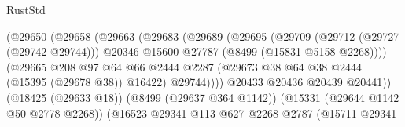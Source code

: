 \begin{lexlean}{RustStd}
\begin{coremodule}
                                            (@29650
                                              (@29658
                                                (@29663
                                                  (@29683
                                                    (@29689
                                                      (@29695
                                                        (@29709
                                                          (@29712 (@29727 (@29742 @29744)))
                                                          @20346
                                                          @15600
                                                          @27787
                                                          (@8499 (@15831 @5158 @2268))))
                                                      (@29665
                                                        @208
                                                        @97
                                                        @64
                                                        @66
                                                        @2444
                                                        @2287
                                                        (@29673
                                                          @38
                                                          @64
                                                          @38
                                                          @2444
                                                          (@15395 (@29678 @38))
                                                          @16422)
                                                        @29744))))
                                                @20433
                                                @20436
                                                @20439
                                                @20441))
                                            (@18425 (@29633 @18))
                                            (@8499 (@29637 @364 @1142))
                                            (@15331 (@29644 @1142 @50 @2778 @2268))
                                            (@16523
                                              @29341
                                              @113
                                              @627
                                              @2268
                                              @2787
                                              (@15711
                                                @29341

\end{coremodule}
\end{lexlean}

